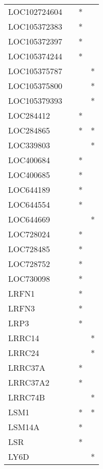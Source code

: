 \begin{longtable}{lccc}
LOC102724604 &           &   * &         \\
LOC105372383 &           &   * &         \\
LOC105372397 &           &   * &         \\
LOC105374244 &           &   * &         \\
LOC105375787 &           &     &       * \\
LOC105375800 &           &     &       * \\
LOC105379393 &           &     &       * \\
LOC284412    &           &   * &         \\
LOC284865    &           &   * &       * \\
LOC339803    &           &     &       * \\
LOC400684    &           &   * &         \\
LOC400685    &           &   * &         \\
LOC644189    &           &   * &         \\
LOC644554    &           &   * &         \\
LOC644669    &           &     &       * \\
LOC728024    &           &   * &         \\
LOC728485    &           &   * &         \\
LOC728752    &           &   * &         \\
LOC730098    &           &   * &         \\
LRFN1        &           &   * &         \\
LRFN3        &           &   * &         \\
LRP3         &           &   * &         \\
LRRC14       &           &     &       * \\
LRRC24       &           &     &       * \\
LRRC37A      &           &   * &         \\
LRRC37A2     &           &   * &         \\
LRRC74B      &           &     &       * \\
LSM1         &           &   * &       * \\
LSM14A       &           &   * &         \\
LSR          &           &   * &         \\
LY6D         &           &     &       * \\

\end{longtable}
